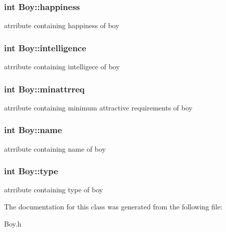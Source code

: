 \subsubsection[{\texorpdfstring{happiness}{happiness}}]{\setlength{\rightskip}{0pt plus 5cm}int Boy\+::happiness}\hypertarget{classBoy_adaf15f15972678dbd77e8b8b319d5767}{}\label{classBoy_adaf15f15972678dbd77e8b8b319d5767}
atrribute containing happiness of boy 
\subsubsection[{\texorpdfstring{intelligence}{intelligence}}]{\setlength{\rightskip}{0pt plus 5cm}int Boy\+::intelligence}\hypertarget{classBoy_a10f24ab1e3dbee6fac2a122c76954fa5}{}\label{classBoy_a10f24ab1e3dbee6fac2a122c76954fa5}
atrribute containing intelligece of boy 
\subsubsection[{\texorpdfstring{minattrreq}{minattrreq}}]{\setlength{\rightskip}{0pt plus 5cm}int Boy\+::minattrreq}\hypertarget{classBoy_a27a29b1780caee1e017280bc08405662}{}\label{classBoy_a27a29b1780caee1e017280bc08405662}
atrribute containing minimum attractive requirements of boy 
\subsubsection[{\texorpdfstring{name}{name}}]{\setlength{\rightskip}{0pt plus 5cm}int Boy\+::name}\hypertarget{classBoy_ae4e7057e134fc1ad61aa245220b01e5a}{}\label{classBoy_ae4e7057e134fc1ad61aa245220b01e5a}
atrribute containing name of boy 
\subsubsection[{\texorpdfstring{type}{type}}]{\setlength{\rightskip}{0pt plus 5cm}int Boy\+::type}\hypertarget{classBoy_a1b907f52b73e8355ce0dd02db65afa4f}{}\label{classBoy_a1b907f52b73e8355ce0dd02db65afa4f}
atrribute containing type of boy 

The documentation for this class was generated from the following file\+:\begin{DoxyCompactItemize}
\item 
Boy.\+h\end{DoxyCompactItemize}
